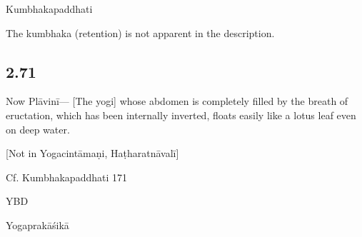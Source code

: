 \begin{ekdosis}
\begin{sources}[hp02_070]
Kumbhakapaddhati

\begin{versinnote}
\end{versinnote}
\end{sources}

\begin{philcomm}[hp02_070]
The kumbhaka (retention) is not apparent in the description.
\end{philcomm}

\subsection*{2.71}
\begin{translation}[hp02_071]
Now Plāvinī---
[The yogi] whose abdomen is completely filled by the breath of eructation, which has been internally inverted, floats easily like a lotus leaf even on deep water.
\end{translation}

\begin{testimonia}[hp02_071]
{[Not in Yogacintāmaṇi, Haṭharatnāvalī]}

Cf. Kumbhakapaddhati 171

\begin{versinnote}
\end{versinnote}

YBD

\begin{versinnote}
\end{versinnote}

Yogaprakāśikā

\begin{versinnote}
\end{versinnote}
\end{testimonia}


\end{ekdosis}
